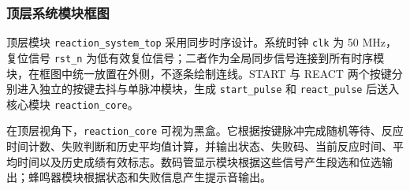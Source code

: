 \subsubsection{顶层系统模块框图}

顶层模块 \texttt{reaction\_system\_top} 采用同步时序设计。系统时钟 \texttt{clk} 为 50 MHz，复位信号 \texttt{rst\_n} 为低有效复位信号；二者作为全局同步信号连接到所有时序模块，在框图中统一放置在外侧，不逐条绘制连线。START 与 REACT 两个按键分别进入独立的按键去抖与单脉冲模块，生成 \texttt{start\_pulse} 和 \texttt{react\_pulse} 后送入核心模块 \texttt{reaction\_core}。

在顶层视角下，\texttt{reaction\_core} 可视为黑盒。它根据按键脉冲完成随机等待、反应时间计数、失败判断和历史平均值计算，并输出状态、失败码、当前反应时间、平均时间以及历史成绩有效标志。数码管显示模块根据这些信号产生段选和位选输出；蜂鸣器模块根据状态和失败信息产生提示音输出。

